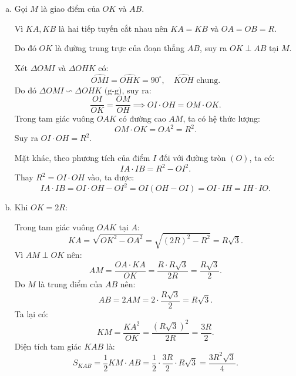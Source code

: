 \begin{bt}
{\begin{enumerate}[a)]
			Suy ra bốn điểm $K, A, O, H$ cùng thuộc đường tròn đường kính $KO$.
			\item Gọi $M$ là giao điểm của $OK$ và $AB$.
			
			Vì $KA, KB$ là hai tiếp tuyến cắt nhau nên $KA = KB$ và $OA = OB = R$.
			
			Do đó $OK$ là đường trung trực của đoạn thẳng $AB$, suy ra $OK \perp AB$ tại $M$.
			
			Xét $\Delta OMI$ và $\Delta OHK$ có:
			$$\widehat{OMI} = \widehat{OHK} = 90^\circ,\quad \widehat{KOH}\text{ chung}.$$
			Do đó $\Delta OMI \backsim \Delta OHK\text{ (g-g)}$, suy ra:
			$$\dfrac{OI}{OK} = \dfrac{OM}{OH} \implies OI \cdot OH = OM \cdot OK.$$
			Trong tam giác vuông $OAK$ có đường cao $AM$, ta có hệ thức lượng:
			$$OM \cdot OK = OA^2 = R^2.$$
			Suy ra $OI \cdot OH = R^2$.
			
			Mặt khác, theo phương tích của điểm $I$ đối với đường tròn $(O)$, ta có:
			$$IA \cdot IB = R^2 - OI^2.$$
			Thay $R^2 = OI \cdot OH$ vào, ta được:
			$$IA \cdot IB = OI \cdot OH - OI^2 = OI(OH - OI) = OI \cdot IH = IH \cdot IO.$$
			\item Khi $OK = 2R$:
			
			Trong tam giác vuông $OAK$ tại $A$:
			$$KA = \sqrt{OK^2 - OA^2} = \sqrt{(2R)^2 - R^2} = R\sqrt{3}.$$
			Vì $AM \perp OK$ nên:
			$$AM = \dfrac{OA \cdot KA}{OK} = \dfrac{R \cdot R\sqrt{3}}{2R} = \dfrac{R\sqrt{3}}{2}.$$
			Do $M$ là trung điểm của $AB$ nên:
			$$AB = 2AM = 2 \cdot \dfrac{R\sqrt{3}}{2} = R\sqrt{3}.$$
			Ta lại có:
			$$KM = \dfrac{KA^2}{OK} = \dfrac{(R\sqrt{3})^2}{2R} = \dfrac{3R}{2}.$$
			Diện tích tam giác $KAB$ là:
			$$S_{KAB} = \dfrac{1}{2} KM \cdot AB = \dfrac{1}{2} \cdot \dfrac{3R}{2} \cdot R\sqrt{3} = \dfrac{3R^2\sqrt{3}}{4}.$$
		\end{enumerate}
	}
\end{bt}


